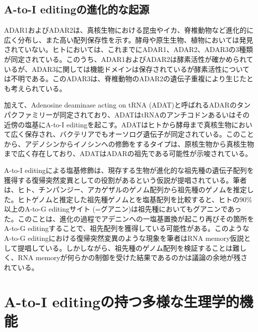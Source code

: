 \subsection{A-to-I editingの進化的な起源}
ADAR1およびADAR2は、真核生物における昆虫やイカ、脊椎動物など進化的に広く分布し、また高い配列保存性を示す。酵母や原生生物、植物においては発見されていない。ヒトにおいては、これまでにADAR1、ADAR2、ADAR3の3種類が同定されている。このうち、ADAR1およびADAR2は酵素活性が確かめられているが、ADAR3に関しては機能ドメインは保存されているが酵素活性については不明である。このADAR3は、脊椎動物のADAR2の遺伝子重複により生じたとも考えられている。
\par
加えて、Adenosine deaminase acting on tRNA (ADAT)と呼ばれるADARのタンパクファミリーが同定されており、ADATはtRNAのアンチコドンあるいはその近傍の塩基にA-to-I editingを起こす。ADATはヒトから酵母まで真核生物において広く保存され、バクテリアでもオーソログ遺伝子が同定されている。このことから、アデノシンからイノシンへの修飾をするタイプは、原核生物から真核生物まで広く存在しており、ADATはADARの祖先である可能性が示唆されている。
\par
A-to-I editingによる塩基修飾は、現存する生物が進化的な祖先種の遺伝子配列を獲得する復帰突然変異としての役割があるという仮説が提唱されている。筆者は、ヒト、チンパンジー、アカゲザルのゲノム配列から祖先種のゲノムを推定した。ヒトゲノムと推定した祖先種ゲノムとを塩基配列を比較すると、ヒトの90\%以上のA-to-G editingサイト (=グアニン)は祖先種においてもグアニンであった。このことは、進化の過程でアデニンへの一塩基置換が起こり再びその箇所をA-to-G editingすることで、祖先配列を獲得している可能性がある。このようなA-to-G editingにおける復帰突然変異のような現象を筆者はRNA memory仮説として提唱している。しかしながら、祖先種のゲノム配列を検証することは難しく、RNA memoryが何らかの制御を受けた結果であるのかは議論の余地が残されている。

\section{A-to-I editingの持つ多様な生理学的機能}
